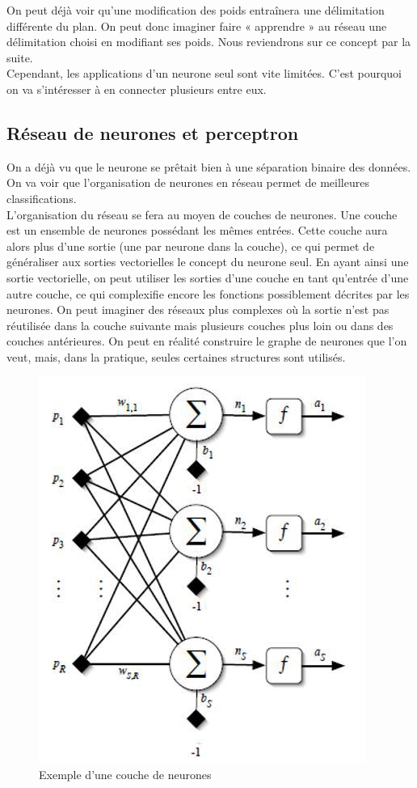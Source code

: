On peut déjà voir qu’une modification des poids entraînera une délimitation différente du plan. On peut donc imaginer faire « apprendre » au réseau une délimitation choisi en modifiant ses poids. Nous reviendrons sur ce concept par la suite.\\
Cependant, les applications d’un neurone seul sont vite limitées. C’est pourquoi on va s’intéresser à en connecter plusieurs entre eux.

\subsection{Réseau de neurones et perceptron} %
\label{sub:reseau_de_neurones}
On a déjà vu que le neurone se prêtait bien à une séparation binaire des données. On va voir que l’organisation de neurones en réseau permet de meilleures classifications.\\
L’organisation du réseau se fera au moyen de couches de neurones. Une couche est un ensemble de neurones possédant les mêmes entrées. Cette couche aura alors plus d'une sortie (une par neurone dans la couche), ce qui permet de généraliser aux sorties vectorielles le concept du neurone seul. En ayant ainsi une sortie vectorielle, on peut utiliser les sorties d'une couche en tant qu'entrée d'une autre couche, ce qui complexifie encore les fonctions possiblement décrites par les neurones.
On peut imaginer des réseaux plus complexes où la sortie n'est pas réutilisée dans la couche suivante mais plusieurs couches plus loin ou dans des couches antérieures. On peut en réalité construire le graphe de neurones que l'on veut, mais, dans la pratique, seules certaines structures sont utilisés. 

\begin{figure}[h]
  \centerline{\includegraphics[width=0.5\linewidth]{fig/schemacouche.jpg}}
  \caption{Exemple d'une couche de neurones}
  \label{fig:couche}
\end{figure}

